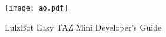 %
%
%
%
%

\date {}
\thispagestyle{empty}
\begin{center}
\par
\texttt{[image: ao.pdf]}
\par
\null\vfill
{\fontsize{25pt}{5cm}\selectfont \textcolor{ao-purple}{LulzBot Easy TAZ Mini Developer's Guide}}
\end{center}
